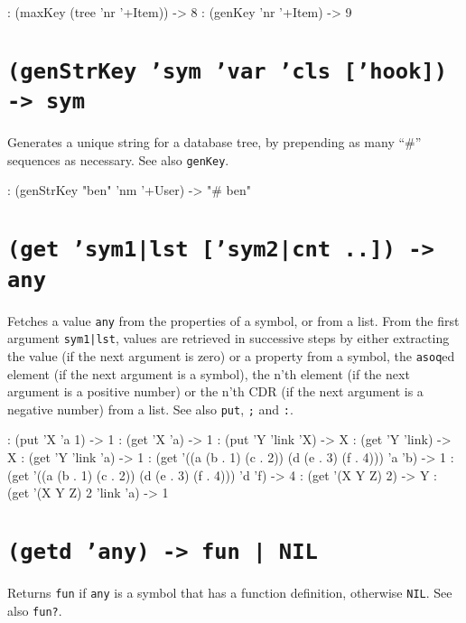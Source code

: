 \begin{wideverbatim}
: (maxKey (tree 'nr '+Item))
-> 8
: (genKey 'nr '+Item)
-> 9
\end{wideverbatim}

 
\section*{\texttt{(genStrKey 'sym 'var 'cls ['hook]) -> sym}}
\label{sec:func-ref-G-(genStrKey 'sym 'var 'cls ['hook]) -> sym}


Generates a unique string for a database tree, by prepending as many ``\#''
sequences as necessary. See also \texttt{genKey}.


\begin{wideverbatim}
: (genStrKey "ben" 'nm '+User)
-> "# ben"
\end{wideverbatim}

 
\section*{\texttt{(get 'sym1|lst ['sym2|cnt ..]) -> any}}
\label{sec:func-ref-G-(get 'sym1|lst ['sym2|cnt ..]) -> any}


Fetches a value \texttt{any} from the properties of a symbol, or from a list.
From the first argument \texttt{sym1|lst}, values are retrieved in successive
steps by either extracting the value (if the next argument is zero) or a
property from a symbol, the \texttt{asoq}ed element (if the next argument is a
symbol), the n'th element (if the next argument is a positive number) or
the n'th CDR (if the next argument is a negative number) from a list.
See also \texttt{put}, \texttt{;} and \texttt{:}.


\begin{wideverbatim}
: (put 'X 'a 1)
-> 1
: (get 'X 'a)
-> 1
: (put 'Y 'link 'X)
-> X
: (get 'Y 'link)
-> X
: (get 'Y 'link 'a)
-> 1
: (get '((a (b . 1) (c . 2)) (d (e . 3) (f . 4))) 'a 'b)
-> 1
: (get '((a (b . 1) (c . 2)) (d (e . 3) (f . 4))) 'd 'f)
-> 4
: (get '(X Y Z) 2)
-> Y
: (get '(X Y Z) 2 'link 'a)
-> 1
\end{wideverbatim}

 
\section*{\texttt{(getd 'any) -> fun | NIL}}
\label{sec:func-ref-G-(getd 'any) -> fun | NIL}


Returns \texttt{fun} if \texttt{any} is a symbol that has a function definition,
otherwise \texttt{NIL}. See also \texttt{fun?}.


